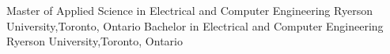 %
%
%

\begin{scholarship}
				{Master of Applied Science in Electrical and Computer Engineering}
				{Ryerson University,Toronto, Ontario}
				{Bachelor in Electrical and Computer Engineering}
				{Ryerson University,Toronto, Ontario}
\end{scholarship}